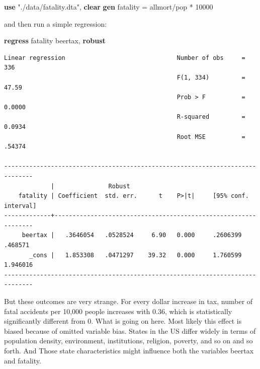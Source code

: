 \documentclass[
]{book}
\newenvironment{Shaded}{\begin{snugshade}}{\end{snugshade}}
\newcommand{\KeywordTok}[1]{\textcolor[rgb]{0.13,0.29,0.53}{\textbf{#1}}}
\newcommand{\NormalTok}[1]{#1}
\newcommand{\StringTok}[1]{\textcolor[rgb]{0.31,0.60,0.02}{#1}}
\begin{document}
\begin{Shaded}
\begin{Highlighting}[]
\KeywordTok{use} \StringTok{"./data/fatality.dta"}\NormalTok{, }\KeywordTok{clear}
\KeywordTok{gen}\NormalTok{ fatality = allmort/pop * 10000}
\end{Highlighting}
\end{Shaded}

and then run a simple regression:

\begin{Shaded}
\begin{Highlighting}[]
\KeywordTok{regress}\NormalTok{ fatality beertax, }\KeywordTok{robust}
\end{Highlighting}
\end{Shaded}

\begin{verbatim}
Linear regression                               Number of obs     =        336
                                                F(1, 334)         =      47.59
                                                Prob > F          =     0.0000
                                                R-squared         =     0.0934
                                                Root MSE          =     .54374

------------------------------------------------------------------------------
             |               Robust
    fatality | Coefficient  std. err.      t    P>|t|     [95% conf. interval]
-------------+----------------------------------------------------------------
     beertax |   .3646054   .0528524     6.90   0.000     .2606399     .468571
       _cons |   1.853308   .0471297    39.32   0.000     1.760599    1.946016
------------------------------------------------------------------------------
\end{verbatim}

But these outcomes are very strange. For every dollar increase in tax, number of fatal accidents per 10,000 people increases with 0.36, which is statistically significantly different from 0. What is going on here. Most likely this effect is biased because of omitted variable bias. States in the US differ widely in terms of population density, environment, institutions, religion, poverty, and so on and so forth. And Those state characteristics might influence both the variables beertax and fatality.
\end{document}
